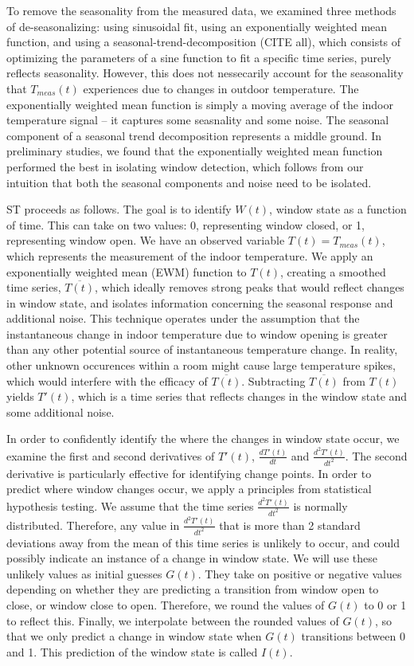 \documentclass[sigconf]{acmart}
\begin{document}
To remove the seasonality from the measured data, we examined three
methods of de-seasonalizing: using sinusoidal fit, using an
exponentially weighted mean function, and using a
seasonal-trend-decomposition (CITE all), which consists of optimizing
the parameters of a sine function to fit a specific time series, purely
reflects seasonality. However, this does not nessecarily account for the
seasonality that \(T_{meas}(t)\) experiences due to changes in outdoor
temperature. The exponentially weighted mean function is simply a moving
average of the indoor temperature signal -- it captures some seasnality
and some noise. The seasonal component of a seasonal trend decomposition
represents a middle ground. In preliminary studies, we found that the
exponentially weighted mean function performed the best in isolating
window detection, which follows from our intuition that both the
seasonal components and noise need to be isolated.

ST proceeds as follows. The goal is to identify \(W(t)\), window state
as a function of time. This can take on two values: 0, representing
window closed, or 1, representing window open. We have an observed
variable \(T(t) = T_{meas}(t)\), which represents the measurement of the
indoor temperature. We apply an exponentially weighted mean (EWM)
function to \(T(t)\), creating a smoothed time series,
\(\overline{T(t)}\), which ideally removes strong peaks that would
reflect changes in window state, and isolates information concerning the
seasonal response and additional noise. This technique operates under
the assumption that the instantaneous change in indoor temperature due
to window opening is greater than any other potential source of
instantaneous temperature change. In reality, other unknown occurences
within a room might cause large temperature spikes, which would
interfere with the efficacy of \(\overline{T(t)}\). Subtracting
\(\overline{T(t)}\) from \(T(t)\) yields \(T'(t)\), which is a time
series that reflects changes in the window state and some additional
noise.

In order to confidently identify the where the changes in window state
occur, we examine the first and second derivatives of \(T'(t)\),
\(\frac{dT'(t)}{dt}\) and \(\frac{d^2T'(t)}{dt^2}\). The second
derivative is particularly effective for identifying change points. In
order to predict where window changes occur, we apply a principles from
statistical hypothesis testing. We assume that the time series
\(\frac{d^2T'(t)}{dt^2}\) is normally distributed. Therefore, any value
in \(\frac{d^2T'(t)}{dt^2}\) that is more than 2 standard deviations
away from the mean of this time series is unlikely to occur, and could
possibly indicate an instance of a change in window state. We will use
these unlikely values as initial guesses \(G(t)\). They take on positive
or negative values depending on whether they are predicting a transition
from window open to close, or window close to open. Therefore, we round
the values of \(G(t)\) to 0 or 1 to reflect this. Finally, we
interpolate between the rounded values of \(G(t)\), so that we only
predict a change in window state when \(G(t)\) transitions between 0 and
1. This prediction of the window state is called \(I(t)\).
\end{document}
